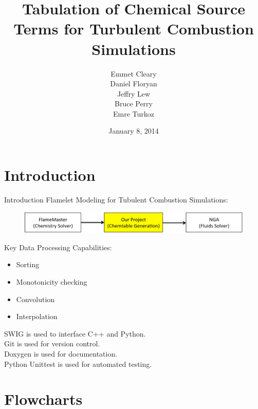 \documentclass{beamer}
\title[APC 524 Design Review]{Tabulation of Chemical Source Terms for Turbulent Combustion Simulations}
\author{Emmet Cleary \\
Daniel Floryan \\
Jeffry Lew \\
Bruce Perry \\
Emre Turkoz}
\date{January 8, 2014}
\begin{document}
\begin{frame}
  \titlepage
\end{frame}


\section{Introduction}
\begin{frame}{Introduction}
Flamelet Modeling for Tubulent Combustion Simulations:
\begin{figure}
\includegraphics[width=\textwidth]{scope.pdf}
\end{figure}
Key Data Processing Capabilities:
\begin{itemize}
\item Sorting
\item Monotonicity checking
\item Convolution
\item Interpolation
\end{itemize}
\vspace{12pt}
SWIG is used to interface C++ and Python.\\
Git is used for version control.\\
Doxygen is used for documentation.\\ %
Python Unittest is used for automated testing.
\end{frame}


\section{Flowcharts}
\end{document}
